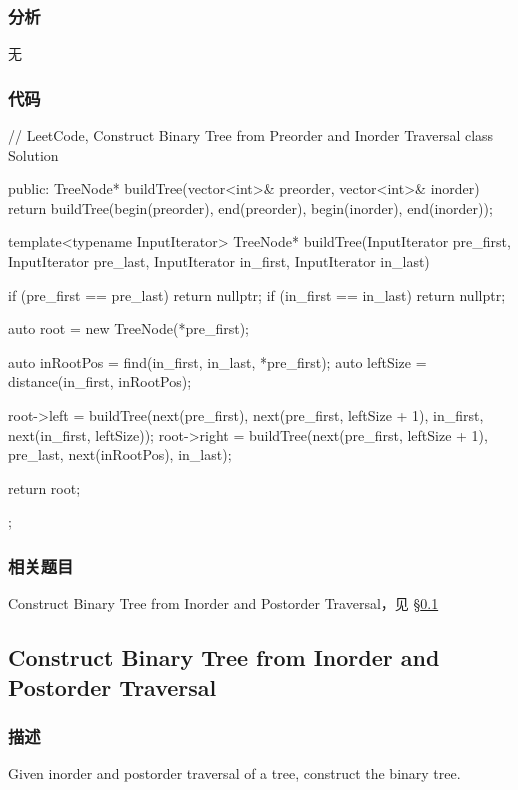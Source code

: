 \subsubsection{分析}
无


\subsubsection{代码}
\begin{Code}
// LeetCode, Construct Binary Tree from Preorder and Inorder Traversal
class Solution {
public:
    TreeNode* buildTree(vector<int>& preorder, vector<int>& inorder) {
        return buildTree(begin(preorder), end(preorder),
                begin(inorder), end(inorder));
    }

    template<typename InputIterator>
    TreeNode* buildTree(InputIterator pre_first, InputIterator pre_last,
            InputIterator in_first, InputIterator in_last) {
        if (pre_first == pre_last) return nullptr;
        if (in_first == in_last) return nullptr;

        auto root = new TreeNode(*pre_first);

        auto inRootPos = find(in_first, in_last, *pre_first);
        auto leftSize = distance(in_first, inRootPos);

        root->left = buildTree(next(pre_first), next(pre_first,
                leftSize + 1), in_first, next(in_first, leftSize));
        root->right = buildTree(next(pre_first, leftSize + 1), pre_last,
                next(inRootPos), in_last);

        return root;
    }
};
\end{Code}


\subsubsection{相关题目}
\begindot
\item Construct Binary Tree from Inorder and Postorder Traversal，见 \S \ref{sec:construct-binary-tree-from-inorder-and-postorder-traversal}
\myenddot


\subsection{Construct Binary Tree from Inorder and Postorder Traversal}
\label{sec:construct-binary-tree-from-inorder-and-postorder-traversal}


\subsubsection{描述}
Given inorder and postorder traversal of a tree, construct the binary tree.

